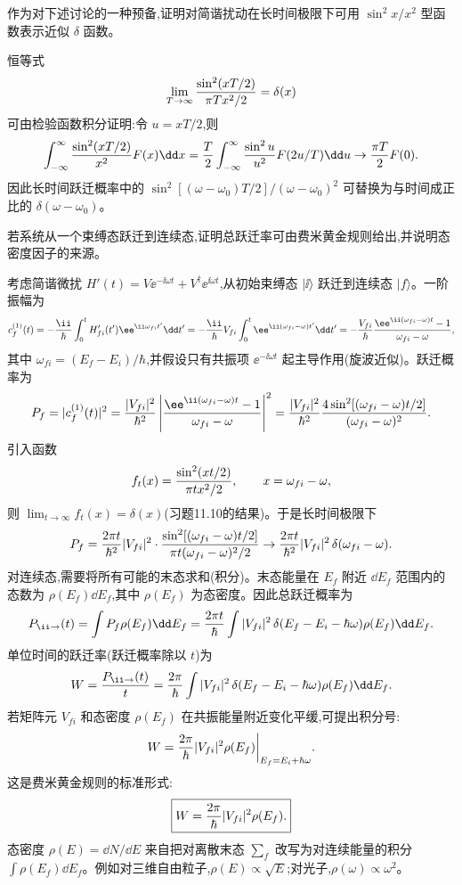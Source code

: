 \begin{question}
作为对下述讨论的一种预备,证明对简谐扰动在长时间极限下可用 $\sin^2 x/x^2$ 型函数表示近似 $\delta$ 函数。
\begin{solution}
恒等式
\[
\lim_{T\to\infty}{\sin^2(xT/2)\over\pi T x^2/2}=\delta(x)
\]
可由检验函数积分证明:令 $u=xT/2$,则
\[
\int_{-\infty}^{\infty}{\sin^2(xT/2)\over x^2}F(x)\dd x
={T\over2}\int_{-\infty}^{\infty}{\sin^2u\over u^2}F(2u/T)\dd u
\to {\pi T\over2}F(0).
\]
因此长时间跃迁概率中的 $\sin^2[(\omega-
\omega_0)T/2]/(
\omega-
\omega_0)^2$ 可替换为与时间成正比的 $\delta(\omega-
\omega_0)$。
\end{solution}
\end{question}

\begin{question}
若系统从一个束缚态跃迁到连续态,证明总跃迁率可由费米黄金规则给出,并说明态密度因子的来源。
\begin{solution}
考虑简谐微扰 $H'(t)=V \ee^{-\ii\omega t}+V^\dagger \ee^{\ii\omega t}$,从初始束缚态 $|\ii\rangle$ 跃迁到连续态 $|f\rangle$。一阶振幅为
\[
c_f^{(1)}(t)=-{\ii\over\hbar}\int_0^t H'_{fi}(t')\ee^{\ii\omega_{fi}t'}\dd t'
=-{\ii\over\hbar}V_{fi}\int_0^t \ee^{\ii(\omega_{fi}-\omega)t'}\dd t'
=-{V_{fi}\over\hbar}{\ee^{\ii(\omega_{fi}-\omega)t}-1\over\omega_{fi}-\omega},
\]
其中 $\omega_{fi}=(E_f-E_i)/\hbar$,并假设只有共振项 $\ee^{-\ii\omega t}$ 起主导作用(旋波近似)。跃迁概率为
\[
P_f=|c_f^{(1)}(t)|^2={|V_{fi}|^2\over\hbar^2}
\left|{\ee^{\ii(\omega_{fi}-\omega)t}-1\over\omega_{fi}-\omega}\right|^2
={|V_{fi}|^2\over\hbar^2}
{4\sin^2[(\omega_{fi}-\omega)t/2]\over(\omega_{fi}-\omega)^2}.
\]
引入函数
\[
f_t(x)={\sin^2(xt/2)\over\pi t x^2/2},\qquad x=\omega_{fi}-\omega,
\]
则 $\lim_{t\to\infty}f_t(x)=\delta(x)$(习题11.10的结果)。于是长时间极限下
\[
P_f={2\pi t\over\hbar^2}|V_{fi}|^2\cdot{\sin^2[(\omega_{fi}-\omega)t/2]\over\pi t(\omega_{fi}-\omega)^2/2}
\to{2\pi t\over\hbar^2}|V_{fi}|^2\,\delta(\omega_{fi}-\omega).
\]
对连续态,需要将所有可能的末态求和(积分)。末态能量在 $E_f$ 附近 $\dd E_f$ 范围内的态数为 $\rho(E_f)\dd E_f$,其中 $\rho(E_f)$ 为态密度。因此总跃迁概率为
\[
P_{\ii\to}(t)=\int P_f\rho(E_f)\dd E_f
={2\pi t\over\hbar}\int|V_{fi}|^2\,\delta(E_f-E_i-\hbar\omega)\rho(E_f)\dd E_f.
\]
单位时间的跃迁率(跃迁概率除以 $t$)为
\[
W={P_{\ii\to}(t)\over t}
={2\pi\over\hbar}\int|V_{fi}|^2\,\delta(E_f-E_i-\hbar\omega)\rho(E_f)\dd E_f.
\]
若矩阵元 $V_{fi}$ 和态密度 $\rho(E_f)$ 在共振能量附近变化平缓,可提出积分号:
\[
W={2\pi\over\hbar}|V_{fi}|^2\rho(E_f)\bigg|_{E_f=E_i+\hbar\omega}.
\]
这是费米黄金规则的标准形式:
\[
\boxed{W={2\pi\over\hbar}|V_{fi}|^2\rho(E_f).}
\]
态密度 $\rho(E)=\dd N/\dd E$ 来自把对离散末态 $\sum_f$ 改写为对连续能量的积分 $\int\rho(E_f)\dd E_f$。例如对三维自由粒子,$\rho(E)\propto\sqrt{E}$;对光子,$\rho(\omega)\propto\omega^2$。
\end{solution}
\end{question}

